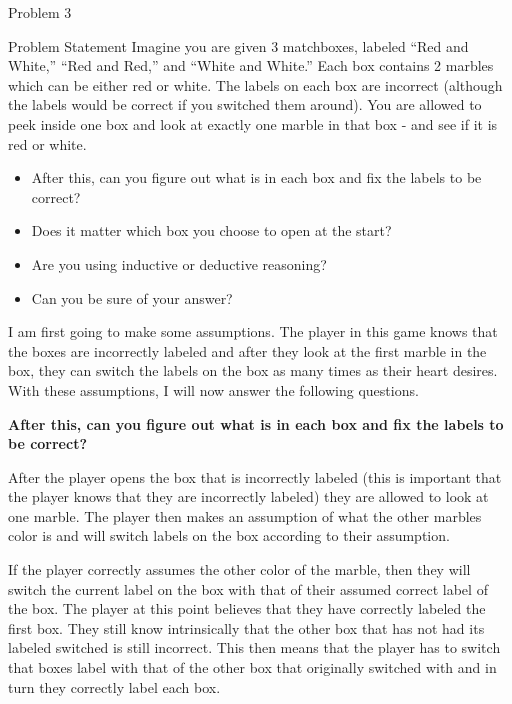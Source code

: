 \begin{problem}{Problem 3}
    \begin{statement}{Problem Statement}
        Imagine you are given 3 matchboxes, labeled “Red and White,” “Red and Red,” and “White and White.” Each box contains 2 marbles which can be either red or white. The labels on each box are 
        incorrect  (although the labels would be correct if you switched them around). You are allowed to peek inside one box and look at exactly one marble in that box - and see if it is red or white.

        \begin{itemize}
            \item After this, can you figure out what is in each box and fix the labels to be correct?
            \item Does it matter which box you choose to open at the start?
            \item Are you using inductive or deductive reasoning?
            \item Can you be sure of your answer?
        \end{itemize}
    \end{statement}
    
    \begin{Highlight}[Solution]
        I am first going to make some assumptions. The player in this game knows that the boxes are incorrectly labeled and after they look at the first marble in the box, they can switch the labels on
        the box as many times as their heart desires. With these assumptions, I will now answer the following questions. \vspace*{1em}

        \noindent \textbf{After this, can you figure out what is in each box and fix the labels to be correct?} \vspace*{1em}

        After the player opens the box that is incorrectly labeled (this is important that the player knows that they are incorrectly labeled) they are allowed to look at one marble. The player then makes
        an assumption of what the other marbles color is and will switch labels on the box according to their assumption.

        If the player correctly assumes the other color of the marble, then they will switch the current label on the box with that of their assumed correct label of the box. The player at this point believes
        that they have correctly labeled the first box. They still know intrinsically that the other box that has not had its labeled switched is still incorrect. This then means that the player has to switch 
        that boxes label with that of the other box that originally switched with and in turn they correctly label each box.


\end{Highlight}
\end{problem}
